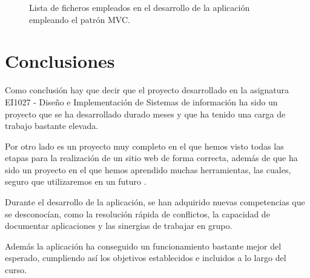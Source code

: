\documentclass[pdftex,11pt,a4paper]{book}
\begin{document}

\begin{figure}[h]
\begin{center}
\caption{\label{arbol} Lista de ficheros empleados en el desarrollo de la aplicación empleando el patrón MVC.}
\end{center}
\end{figure}

\chapter{Conclusiones} 
Como conclusión hay que decir que el proyecto desarrollado en la asignatura EI1027 - Diseño e Implementación de Sistemas de información ha sido un proyecto que se ha desarrollado durado meses y que ha tenido una carga de trabajo bastante elevada.

Por otro lado es un proyecto muy completo en el que hemos visto todas las etapas para la realización de un sitio web de forma correcta, además de que ha sido un proyecto en el que hemos aprendido muchas herramientas, las cuales, seguro que utilizaremos en un futuro .


Durante el desarrollo de la aplicación, se han adquirido nuevas competencias que se desconocían, como la resolución rápida de conflictos, la capacidad de documentar aplicaciones y las sinergias de trabajar en grupo.

Además la aplicación ha conseguido un funcionamiento bastante mejor del esperado, cumpliendo así los objetivos establecidos e incluidos a lo largo del curso.


%
%
\end{document}
